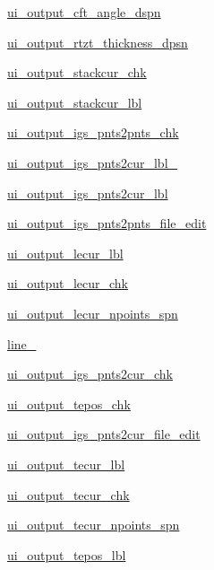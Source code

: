 \begin{DoxyCompactItemize}
\hyperlink{a00074_aa8751b98f2848d66d991f668a8061b50}{ui\+\_\+output\+\_\+cft\+\_\+angle\+\_\+dspn}
\item 
\hyperlink{a00074_a0ce457bc120667aadadd3ade828c65b3}{ui\+\_\+output\+\_\+rtzt\+\_\+thickness\+\_\+dpsn}
\item 
\hyperlink{a00074_a60d8702dcef7ca077c25402d981a2ba9}{ui\+\_\+output\+\_\+stackcur\+\_\+chk}
\item 
\hyperlink{a00074_abd1aece55a53a090e79fd1a7449d67b8}{ui\+\_\+output\+\_\+stackcur\+\_\+lbl}
\item 
\hyperlink{a00074_a02aad1387d04c6ec5ad12e80a6a59d08}{ui\+\_\+output\+\_\+igs\+\_\+pnts2pnts\+\_\+chk}
\item 
\hyperlink{a00074_a9a3e7b7353a08d8254630806f3466fc3}{ui\+\_\+output\+\_\+igs\+\_\+pnts2cur\+\_\+lbl\+\_}
\item 
\hyperlink{a00074_a3a6ca0d33559a544c30ca69a584f5fb3}{ui\+\_\+output\+\_\+igs\+\_\+pnts2cur\+\_\+lbl}
\item 
\hyperlink{a00074_acdf536fc7b4d652bfde2a129ac63af81}{ui\+\_\+output\+\_\+igs\+\_\+pnts2pnts\+\_\+file\+\_\+edit}
\item 
\hyperlink{a00074_a47f948d0d305ed25b5d4199199348306}{ui\+\_\+output\+\_\+lecur\+\_\+lbl}
\item 
\hyperlink{a00074_af26afcf143419489f7a9c388f242550b}{ui\+\_\+output\+\_\+lecur\+\_\+chk}
\item 
\hyperlink{a00074_afccfcfd87634348612a93710d25902d6}{ui\+\_\+output\+\_\+lecur\+\_\+npoints\+\_\+spn}
\item 
\hyperlink{a00074_a9b081326a67dee3b6ab18d2aa0937b1a}{line\+\_}
\item 
\hyperlink{a00074_a550f0dbb76e9a3094c1e38b46f5d885d}{ui\+\_\+output\+\_\+igs\+\_\+pnts2cur\+\_\+chk}
\item 
\hyperlink{a00074_a1fd1e46b01841149ab493b773c6ee08c}{ui\+\_\+output\+\_\+tepos\+\_\+chk}
\item 
\hyperlink{a00074_afc059e5843391ef3e3c56edb1f201cc0}{ui\+\_\+output\+\_\+igs\+\_\+pnts2cur\+\_\+file\+\_\+edit}
\item 
\hyperlink{a00074_af6b3a50b9ed8b101a02f8cd2103add7a}{ui\+\_\+output\+\_\+tecur\+\_\+lbl}
\item 
\hyperlink{a00074_a8a199146fc853fdada7f050f108a22a2}{ui\+\_\+output\+\_\+tecur\+\_\+chk}
\item 
\hyperlink{a00074_aec9a2b9c0199fa892631d906b1296a13}{ui\+\_\+output\+\_\+tecur\+\_\+npoints\+\_\+spn}
\item 
\hyperlink{a00074_a0906e6ac9dd29621615af0e54f1b2768}{ui\+\_\+output\+\_\+tepos\+\_\+lbl}

\end{DoxyCompactItemize}
